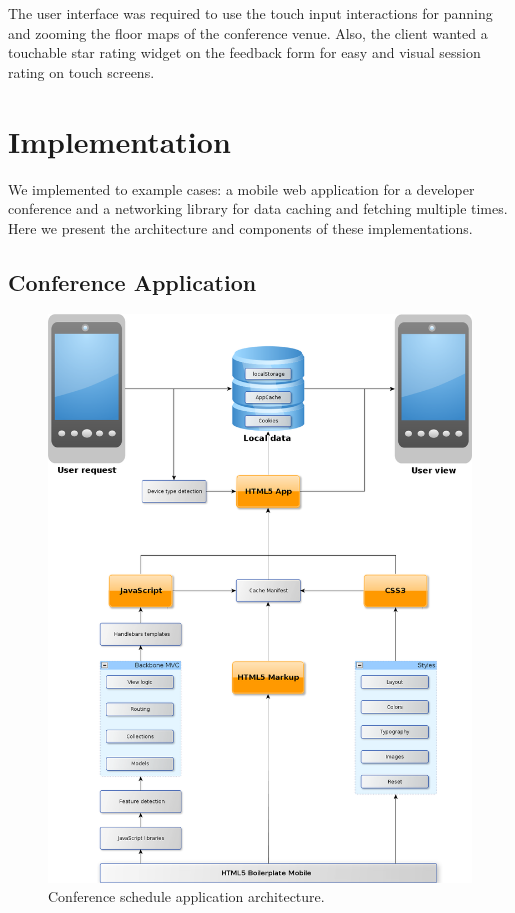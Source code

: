 The user interface was required to use the touch input interactions
for panning and zooming the floor maps of the conference venue. Also,
the client wanted a touchable star rating widget on the feedback form
for easy and visual session rating on touch screens.

\chapter{Implementation}
\label{chapter:implementation}

We implemented to example cases: a mobile web application for a
developer conference and a networking library for data caching and
fetching multiple times. Here we present the architecture and
components of these implementations.

\section{Conference Application}

\begin{figure}[ht]
  \begin{center}
    \includegraphics[width=\textwidth]{images/devdays.png}
    \caption{Conference schedule application architecture.}
    \label{figure:devdays.png}
  \end{center}
\end{figure}

